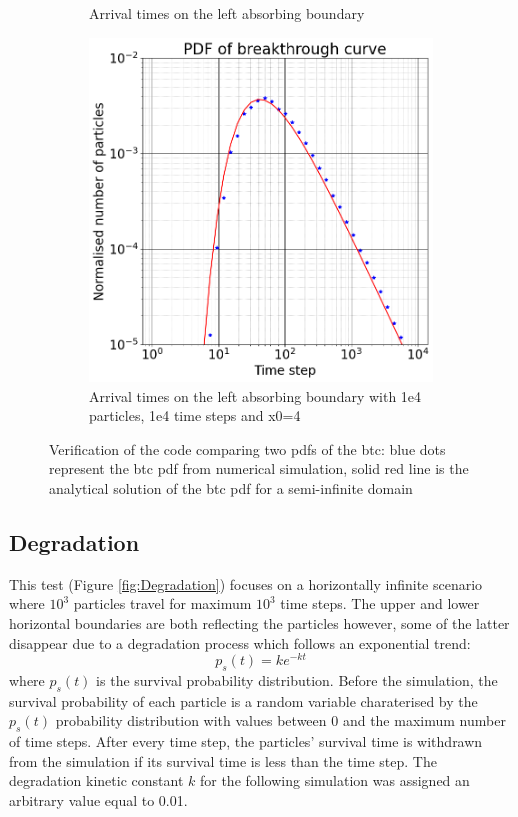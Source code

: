 \documentclass{article}
\begin{document}
\begin{figure}[htbp]
\begin{subfigure}[b]{0.3\textwidth}
        \caption{Arrival times on the left absorbing boundary}
        \label{fig:subplotVerSemiInf}
    \end{subfigure}
    \hfill
    \begin{subfigure}[b]{0.3\textwidth}
        \centering
        \includegraphics[width=\textwidth]{images/verificationSemi-infinite1e5.png} %
        \caption{Arrival times on the left absorbing boundary with 1e4 particles, 1e4 time steps and x0=4}
        \label{fig:subplotVerSemiInfImproved}
    \end{subfigure}
    \caption{Verification of the code comparing two pdfs of the btc: blue dots represent the btc pdf from numerical simulation, solid red line is the analytical solution of the btc pdf for a semi-infinite domain}
    \label{fig:SemiInfinite}
\end{figure}

\subsection{Degradation}
This test (Figure \ref{fig:Degradation}) focuses on a horizontally infinite scenario where $10^3$ particles travel for maximum $10^3$ time steps. The upper and lower horizontal boundaries are both reflecting the particles however, some of the latter disappear due to a degradation process which follows an exponential trend:
\begin{equation}
    p_s(t) = k e^{-kt}
\end{equation}
where $p_s(t)$ is the survival probability distribution. Before the simulation, the survival probability of each particle is a random variable charaterised by the $p_s(t)$ probability distribution with values between 0 and the maximum number of time steps. After every time step, the particles' survival time is withdrawn from the simulation if its survival time is less than the time step. The degradation kinetic constant $k$ for the following simulation was assigned an arbitrary value equal to 0.01.
\end{document}
